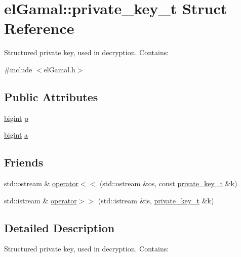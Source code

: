 \hypertarget{structelGamal_1_1private__key__t}{}\section{el\+Gamal\+:\+:private\+\_\+key\+\_\+t Struct Reference}
\label{structelGamal_1_1private__key__t}


Structured private key, used in decryption. Contains\+:  




{\ttfamily \#include $<$el\+Gamal.\+h$>$}

\subsection*{Public Attributes}
\begin{DoxyCompactItemize}
\item 
\mbox{\hyperlink{namespaceelGamal_ab2883bf41ce8d738e2428c8ae81b0245}{bigint}} \mbox{\hyperlink{structelGamal_1_1private__key__t_a9df42cc4041316be72eb435941933ffc}{p}}
\item 
\mbox{\hyperlink{namespaceelGamal_ab2883bf41ce8d738e2428c8ae81b0245}{bigint}} \mbox{\hyperlink{structelGamal_1_1private__key__t_a0e3d2e173ce62a47bf3adf23fe6de6ff}{a}}
\end{DoxyCompactItemize}
\subsection*{Friends}
\begin{DoxyCompactItemize}
\item 
std\+::ostream \& \mbox{\hyperlink{structelGamal_1_1private__key__t_afbe5e9a31935a7144b08a2e4648dda18}{operator$<$$<$}} (std\+::ostream \&os, const \mbox{\hyperlink{structelGamal_1_1private__key__t}{private\+\_\+key\+\_\+t}} \&k)
\item 
std\+::istream \& \mbox{\hyperlink{structelGamal_1_1private__key__t_a43107ca223fbc64064216565f925e6f3}{operator$>$$>$}} (std\+::istream \&is, \mbox{\hyperlink{structelGamal_1_1private__key__t}{private\+\_\+key\+\_\+t}} \&k)
\end{DoxyCompactItemize}


\subsection{Detailed Description}
Structured private key, used in decryption. Contains\+: 


